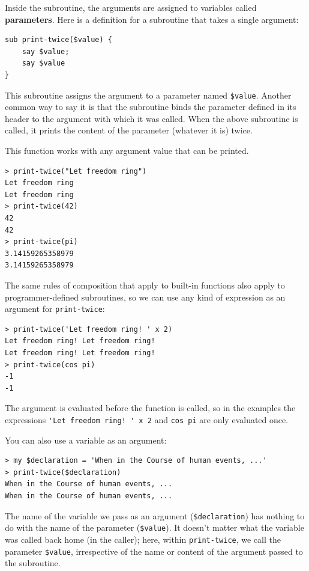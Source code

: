 Inside the subroutine, the arguments are assigned to
variables called {\bf parameters}.  Here is a definition for
a subroutine that takes a single argument:

\begin{verbatim}
sub print-twice($value) {
    say $value;
    say $value
}
\end{verbatim}
%
This subroutine assigns the argument to a parameter
named \verb"$value". Another common way to say it is 
that the subroutine binds the parameter defined in its 
header to the argument with which it was called. When the 
above subroutine is called, it prints the content of the 
parameter (whatever it is) twice.

This function works with any argument value that can be printed.

\begin{verbatim}
> print-twice("Let freedom ring")
Let freedom ring
Let freedom ring
> print-twice(42)
42
42
> print-twice(pi)
3.14159265358979
3.14159265358979
\end{verbatim}
%
The same rules of composition that apply to built-in functions also
apply to programmer-defined subroutines, so we can use any kind of expression
as an argument for \verb"print-twice":

\begin{verbatim}
> print-twice('Let freedom ring! ' x 2)
Let freedom ring! Let freedom ring! 
Let freedom ring! Let freedom ring! 
> print-twice(cos pi)
-1
-1
\end{verbatim}
%
The argument is evaluated before the function is called, so
in the examples the expressions \verb"'Let freedom ring! ' x 2" 
and {\tt cos pi} are only evaluated once.

You can also use a variable as an argument:

\begin{verbatim}
> my $declaration = 'When in the Course of human events, ...'
> print-twice($declaration)
When in the Course of human events, ...
When in the Course of human events, ...
\end{verbatim}
%
The name of the variable we pass as an argument (\verb"$declaration") 
has nothing to do with the name of the parameter (\verb"$value"). It
doesn't matter what the variable was called back home (in the caller);
here, within \verb"print-twice", we call the parameter \verb"$value", 
irrespective of the name or content of the argument passed to the 
subroutine.


